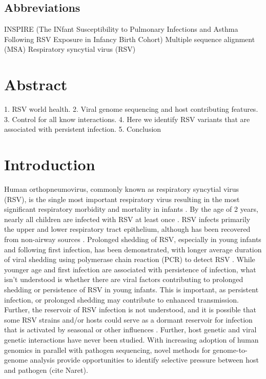 \documentclass{article}
\begin{document}
\linenumbers
\subsection*{Abbreviations}
 INSPIRE (The INfant Susceptibility to Pulmonary Infections and Asthma Following RSV Exposure in Infancy Birth Cohort)
Multiple sequence alignment (MSA)
Respiratory syncytial virus (RSV)

\section{Abstract}
1. RSV world health.
2. Viral genome sequencing and host contributing features.
3. Control for all know interactions.
4. Here we identify RSV variants that are associated with persistent infection.
5. Conclusion

\section{Introduction}
Human orthopneumovirus, commonly known as respiratory syncytial virus (RSV), is the single most important respiratory virus resulting in the most significant respiratory morbidity and mortality in infants 
\cite{hall_burden_2009}.
By the age of 2 years, nearly all children are infected with RSV at least once 
\cite{glezen_risk_1986}.
RSV infects primarily the upper and lower respiratory tract epithelium, although has been recovered from non-airway sources 
\cite{bokun_respiratory_2019,
cubie_detection_1997,
nadal_isolation_1990,
odonnell_respiratory_1998,
rezaee_respiratory_2011,
rohwedder_detection_1998}.
Prolonged shedding of RSV, especially in young infants and following first infection, has been demonstrated, with longer average duration of viral shedding using polymerase chain reaction (PCR) to detect RSV 
\cite{munywoki_influence_2015}.
While younger age and first infection are associated with persistence of infection, what isn't understood is whether there are viral factors contributing to prolonged shedding or persistence of RSV in young infants. 
This is important, as persistent infection, or prolonged shedding may contribute to enhanced transmission. 
Further, the reservoir of RSV infection is not understood, 
and it is possible that some RSV strains and/or hosts could serve as a dormant reservoir for infection that is activated by seasonal or other influences 
\cite{hobson_persistent_2008}.
Further, host genetic and viral genetic interactions have never been studied.
With increasing adoption of human genomics in parallel with pathogen sequencing, novel methods for genome-to-genome analysis provide opportunities to identify selective pressure between host and pathogen (cite Naret).
\end{document}
